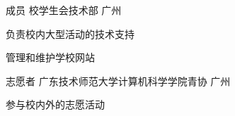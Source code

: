 

\begin{cventries}

  \cventry
    {成员} %
    {校学生会技术部} %
    {广州} %
    {} %
    {
      \begin{cvitems} %
        \item {负责校内大型活动的技术支持}
        \item {管理和维护学校网站}
      \end{cvitems}
    }

  \cventry
    {志愿者} %
    {广东技术师范大学计算机科学学院青协} %
    {广州} %
    {} %
    {
      \begin{cvitems} %
        \item {参与校内外的志愿活动}
      \end{cvitems}
    }

\end{cventries}
